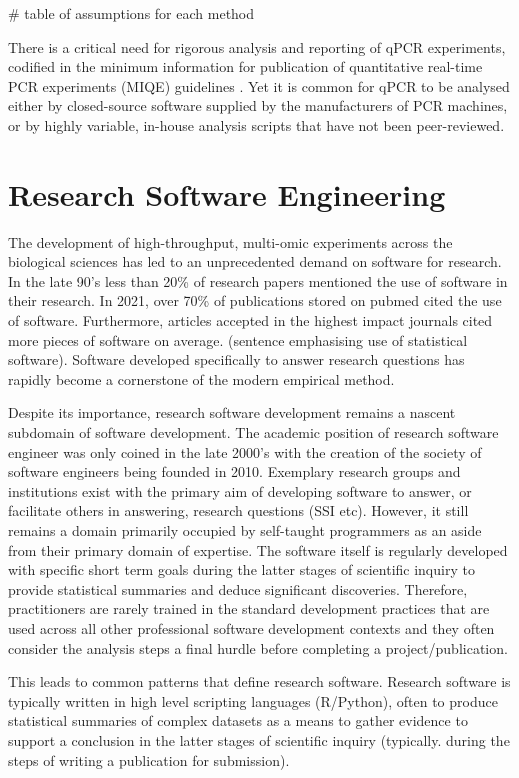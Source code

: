 \documentclass{SBCbookchapter}
\begin{document}
# table of assumptions for each method

There is a critical need for rigorous analysis and reporting of qPCR experiments, codified in the minimum information for publication of quantitative real-time PCR experiments (MIQE) guidelines \cite{Bustin2009, Bustin2017, Courts2019}. Yet it is common for qPCR to be analysed either by closed-source software supplied by the manufacturers of PCR machines, or by highly variable, in-house analysis scripts that have not been peer-reviewed.


\section{Research Software Engineering}

The development of high-throughput, multi-omic experiments across the biological sciences has led to an unprecedented demand on software for research. In the late 90's less than 20\% of research papers mentioned the use of software in their research. In 2021, over 70\% of publications stored on pubmed cited the use of software. Furthermore, articles accepted in the highest impact journals cited more pieces of software on average. (sentence emphasising use of statistical software). Software developed specifically to answer research questions has rapidly become a cornerstone of the modern empirical method. \cite{Schindler2022}

Despite its importance, research software development remains a nascent subdomain of software development. The academic position of research software engineer was only coined in the late 2000's \cite{Prause2010} with the creation of the society of software engineers being founded in 2010. Exemplary research groups and institutions exist with the primary aim of developing software to answer, or facilitate others in answering, research questions (SSI etc). However, it still remains a domain primarily occupied by self-taught programmers as an aside from their primary domain of expertise.  The software itself is regularly developed with specific short term goals during the latter stages of scientific inquiry to provide statistical summaries and deduce significant discoveries. Therefore, practitioners are rarely trained in the standard development practices that are used across all other professional software development contexts and they often consider the analysis steps a final hurdle before completing a project/publication.

This leads to common patterns that define research software. Research software is typically written in high level scripting languages (R/Python), often to produce statistical summaries of complex datasets as a means to gather evidence to support a conclusion in the latter stages of scientific inquiry (typically. during the steps of writing a publication for submission).
\end{document}
